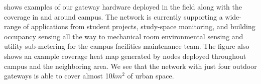   shows examples of our gateway hardware deployed in the field along with the coverage in and around campus.  The network is currently supporting a wide-range of applications from student projects, study-space monitoring, and building occupancy sensing all the way to mechanical room environmental sensing and utility sub-metering for the campus facilities maintenance team.  The figure also shows an example coverage heat map generated by nodes deployed throughout campus and the neighboring area.  We see that the network with just four outdoor gateways is able to cover almost 10$km^2$ of urban space.

